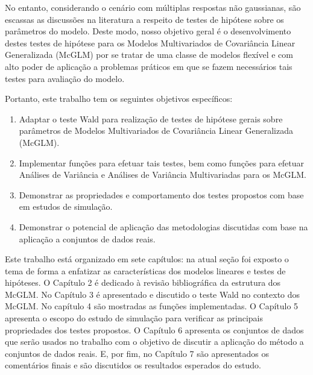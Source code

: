 No entanto, considerando o cenário com múltiplas respostas não gaussianas, são escassas as discussões na literatura a respeito de testes de hipótese sobre os parâmetros do modelo. Deste modo, nosso objetivo geral é o desenvolvimento destes testes de hipótese para os Modelos Multivariados de Covariância Linear Generalizada (McGLM) por se tratar de uma classe de modelos flexível e com alto poder de aplicação a problemas práticos em que se fazem necessários tais testes para avaliação do modelo.

Portanto, este trabalho tem os seguintes objetivos específicos:

\begin{enumerate}
  
  \item Adaptar o teste Wald para realização de testes de hipótese gerais sobre parâmetros de Modelos Multivariados de Covariância Linear Generalizada (McGLM).
  
  \item Implementar funções para efetuar tais testes, bem como funções para efetuar Análises de Variância e Análises de Variância Multivariadas para os McGLM.
  
  \item Demonstrar as propriedades e comportamento dos testes propostos com base em estudos de simulação.
  
  \item Demonstrar o potencial de aplicação das metodologias discutidas com base na aplicação a conjuntos de dados reais.
  
\end{enumerate}

Este trabalho está organizado em sete capítulos: na atual seção foi exposto o tema de forma a enfatizar as características dos modelos lineares e testes de hipóteses. O Capítulo 2 é dedicado à revisão bibliográfica da estrutura dos McGLM. No Capítulo 3 é apresentado e discutido o teste Wald no contexto dos McGLM. No capítulo 4 são mostradas as funções implementadas. O Capítulo 5 apresenta o escopo do estudo de simulação para verificar as principais propriedades dos testes propostos. O Capítulo 6 apresenta os conjuntos de dados que serão usados no trabalho com o objetivo de discutir a aplicação do método a conjuntos de dados reais. E, por fim, no Capítulo 7 são apresentados os comentários finais e são discutidos os resultados esperados do estudo.

